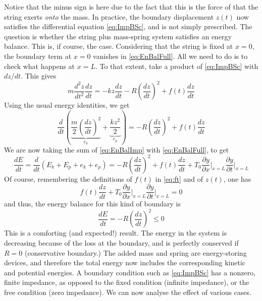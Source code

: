 \documentclass[11pt,twoside,a4paper,english]{book}
\begin{document}
Notice that the minus sign is here due to the fact that this is the force of that the string exerts \emph{onto} the mass. In practice, the boundary displacement $z(t)$ now satisfies the differential equation \eqref{eq:ImpBSc}, and is not simply prescribed. The question is whether the string plus mass-spring system satisfies an energy balance. This is, if course, the case. Considering that the string is fixed at $x=0$, the boundary term at $x=0$ vanishes in \eqref{eq:EnBalFull}. All we need to do is to check what happens at $x=L$. To that extent, take a product of \eqref{eq:ImpBSc} with $dz/dt$. This gives
\begin{equation}
m \frac{d^2 z}{dt^2}\frac{d z}{dt} = - k z\frac{d z}{dt} - R \left(\frac{d z}{dt}\right)^2 + f(t)\frac{d z}{dt}
\end{equation}
Using the usual energy identities, we get
\begin{equation}
\frac{d}{dt}\left( \underbrace{\frac{m}{2} \left(\frac{d z}{dt}\right)^2}_{e_k} + \underbrace{\frac{k z^2}{2}}_{e_p} \right) = - R \left(\frac{d z}{dt}\right)^2 + f(t)\frac{d z}{dt}
\end{equation}
We are now taking the sum of \eqref{eq:EnBalImp} with  \eqref{eq:EnBalFull}, to get
\begin{equation}
\frac{dE}{dt} = \frac{d}{dt}\left(E_k + E_p + e_k + e_p \right) = - R \left(\frac{d z}{dt}\right)^2 + f(t)\frac{d z}{dt} + T_0 \frac{\partial y}{\partial x}\Bigg|_{x=L} \frac{\partial y}{\partial t} \Bigg|_{x=L}
\end{equation}
Of course, remembering the definitions of $f(t)$ in \eqref{eq:ft} and of $z(t)$, one has 
\begin{equation}
f(t)\frac{d z}{dt} + T_0 \frac{\partial y}{\partial x}\Bigg|_{x=L} \frac{\partial y}{\partial t} \Bigg|_{x=L} = 0
\end{equation}
and thus, the energy balance for this kind of boundary is
\begin{equation}\label{eq:EnBalImp}
\frac{dE}{dt} = - R \left(\frac{d z}{dt}\right)^2 \leq 0
\end{equation}
This is a comforting (and expected!) result. The energy in the system is decreasing because of the loss at the boundary, and is perfectly conserved if $R=0$ (conservative boundary.) The added mass and spring are energy-storing devices, and therefore the total energy now includes the corresponding kinetic and potential energies. A boundary condition such as \eqref{eq:ImpBSc} has a nonzero, finite impedance, as opposed to the fixed condition (infinite impedance), or the free condition (zero impedance). We can now analyse the effect of various cases.
\end{document}
